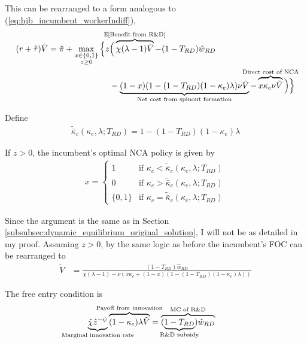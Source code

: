 \documentclass[11pt,english]{article}
\begin{document}
This can be rearranged to a form analogous to (\ref{eq:hjb_incumbent_workerIndiff}),
\begin{align}
(r + \hat{\tau}) \tilde{V} = \tilde{\pi} + \max_{\substack{x \in \{0,1\} \\ z \ge 0}} \Big\{z &\Big( \overbrace{\chi (\lambda - 1) \tilde{V}}^{\mathclap{\mathbb{E}[\textrm{Benefit from R\&D}]}}- (1-T_{RD}) \hat{w}_{RD} \\
&-  \underbrace{(1-x)(1 - (1-T_{RD})(1-\kappa_{e})\lambda)\nu \tilde{V}}_{\mathclap{\text{Net cost from spinout formation}}} - \overbrace{x \kappa_{c} \nu \tilde{V}}^{\mathclap{\text{Direct cost of NCA}}}\Big) \Big\} \label{eq:hjb_incumbent_RDsubsidy_2}
\end{align}

Define
\begin{align}
\tilde{\bar{\kappa}}_c(\kappa_e,\lambda;T_{RD}) = 1 - (1-T_{RD})(1-\kappa_e)\lambda
\end{align} 

If $z > 0$, the incumbent's optimal NCA policy is given by 
\begin{align}
x = \begin{cases}
1 & \textrm{if } \kappa_{c} < \tilde{\bar{\kappa}}_c (\kappa_e, \lambda;T_{RD}) \\
0 & \textrm{if } \kappa_{c} > \tilde{\bar{\kappa}}_c (\kappa_e, \lambda;T_{RD})\\
\{0,1\} & \textrm{if } \kappa_c = \tilde{\bar{\kappa}}_c (\kappa_e, \lambda;T_{RD})
\end{cases} \label{eq:nca_policy_RDsubsidy}
\end{align}

Since the argument is the same as in Section \ref{subsubsec:dynamic_equilibrium_original_solution}, I will not be as detailed in my proof. Assuming $z > 0$, by the same logic as before the incumbent's FOC can be rearranged to
\begin{align}
\tilde{V} &= \frac{(1-T_{RD})\hat{w}_{RD}}{\chi(\lambda -1) - \nu (x\kappa_c + (1-x)(1 - (1-T_{RD})(1-\kappa_e)\lambda)) } \label{eq:hjb_incumbent_foc_RDsubsidy}
\end{align}

The free entry condition is
\begin{align}
\underbrace{\hat{\chi} \hat{z}^{-\psi}}_{\mathclap{\text{Marginal innovation rate}}} \overbrace{(1-\kappa_e) \lambda \tilde{V}}^{\mathclap{\text{Payoff from innovation}}} &= \overbrace{(\underbrace{1-T_{RD}}_{\mathclap{\text{R\&D subsidy}}})\hat{w}_{RD}}^{\mathclap{\text{MC of R\&D}}} \label{eq:free_entry_condition_RDsubsidy}
\end{align}
\end{document}
